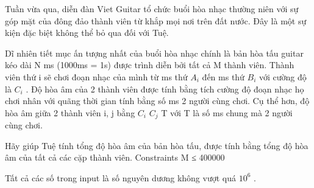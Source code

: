 Tuần vừa qua, diễn đàn Viet Guitar tổ chức buổi hòa nhạc thường niên với sự góp mặt của đông đảo thành viên từ khắp mọi nơi trên đất nước. Đây là một sự kiện đặc biệt không thể bỏ qua đối với Tuệ.  

   Dĩ nhiên tiết mục ấn tượng nhất của buổi hòa nhạc chính là bản hòa tấu guitar kéo dài N ms (1000ms = 1s) được trình diễn bởi tất cả M thành viên. Thành viên thứ i sẽ chơi đoạn nhạc của mình từ ms thứ $A_{i}$   đến ms thứ $B_{i}$   với cường độ là $C_{i}$   . Độ hòa âm của 2 thành viên được tính bằng tích cường độ đoạn nhạc họ chơi nhân với quãng thời gian tính bằng số ms 2 người cùng chơi. Cụ thể hơn, độ hòa âm giữa 2 thành viên i, j bằng $C_{i}$   $C_{j}$   T với T là số ms chung mà 2 người cùng chơi.  

   Hãy giúp Tuệ tính tổng độ hòa âm của bản hòa tấu, được tính bằng tổng độ hòa âm của tất cả các cặp thành viên.
Constraints
M ≤ 400000  

   Tất cả các số trong input là số nguyên dương không vượt quá $10^{6}$   .